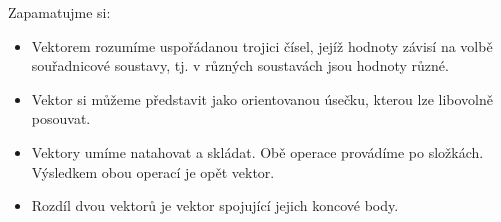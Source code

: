     \begin{mdframed}[style=mdnote]       
      Zapamatujme si:
      \begin{itemize}[noitemsep]
        \item Vektorem rozumíme uspořádanou trojici čísel, jejíž hodnoty závisí na volbě
              souřadnicové soustavy, tj. v různých soustavách jsou hodnoty různé.
        \item Vektor si můžeme představit jako orientovanou úsečku, kterou lze libovolně posouvat.  
        \item Vektory umíme natahovat a skládat. Obě operace provádíme po složkách. Výsledkem obou
              operací je opět vektor. 
        \item Rozdíl dvou vektorů je vektor spojující jejich koncové body. 
      \end{itemize}
    \end{mdframed}

